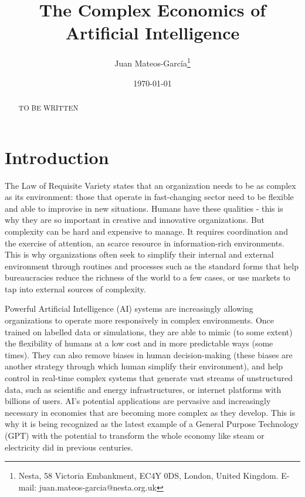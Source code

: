 \documentclass[11pt]{article}
\begin{document}
\begin{titlepage}
\title{The Complex Economics of Artificial Intelligence}
\author{Juan Mateos-Garc\'{i}a\thanks{Nesta, 58 Victoria Embankment, EC4Y 0DS, London, United Kingdom. E-mail: juan.mateos-garcia@nesta.org.uk}}
\date{\today}
\maketitle
\begin{abstract}
\noindent TO BE WRITTEN
\bigskip
\end{abstract}

\setcounter{page}{0}
\thispagestyle{empty}
\end{titlepage}

\section{Introduction}
The Law of Requisite Variety states that an organization needs to be as complex as its environment: those that operate in fast-changing sector need to be flexible and able to improvise in new situations. Humans have these qualities - this is why they are so important in creative and innovative organizations. But complexity can be hard and expensive to manage. It requires coordination and the exercise of attention, an scarce resource in information-rich environments. This is why organizations often seek to simplify their internal and external environment through routines and processes such as the standard forms that help bureaucracies reduce the richness of the world to a few cases, or use markets to tap into external sources of complexity. 

Powerful Artificial Intelligence (AI) systems are increasingly allowing organizations to operate more responsively in complex environments. Once trained on labelled data or simulations, they are able to mimic (to some extent) the flexibility of humans at a low cost and in more predictable ways (some times). They can also remove biases in human decision-making (these biases are another strategy through which human simplify their environment), and help control in real-time complex systems that generate vast streams of unstructured data, such as scientific and energy infrastructures, or internet platforms with billions of users. AI's potential applications are pervasive and increasingly necessary in economies that are becoming more complex as they develop. This is why it is being recognized as the latest example of a General Purpose Technology (GPT) with the potential to transform the whole economy like steam or electricity did in previous centuries.
\end{document}
